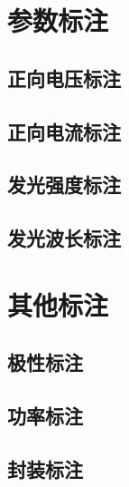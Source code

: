 \documentclass[12pt,UTF8]{ctexbook}
\begin{document}
\section{参数标注}

\subsection{正向电压标注}

\subsection{正向电流标注}

\subsection{发光强度标注}

\subsection{发光波长标注}

\section{其他标注}

\subsection{极性标注}

\subsection{功率标注}

\subsection{封装标注}

\backmatter
\end{document}
